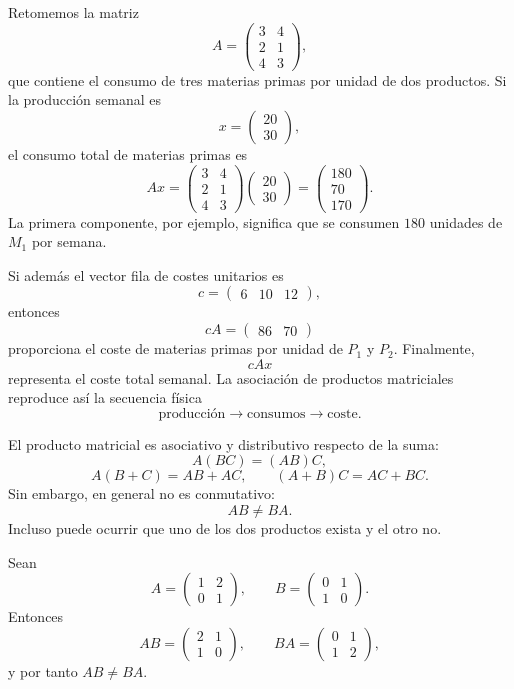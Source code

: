 \begin{example}
Retomemos la matriz
\[
A=
\begin{pmatrix}
3&4\\
2&1\\
4&3
\end{pmatrix},
\]
que contiene el consumo de tres materias primas por unidad de dos productos. Si la producción semanal es
\[
x=\begin{pmatrix}20\\30\end{pmatrix},
\]
el consumo total de materias primas es
\[
Ax=
\begin{pmatrix}
3&4\\
2&1\\
4&3
\end{pmatrix}
\begin{pmatrix}20\\30\end{pmatrix}
=
\begin{pmatrix}
180\\70\\170
\end{pmatrix}.
\]
La primera componente, por ejemplo, significa que se consumen $180$ unidades de $M_1$ por semana.

Si además el vector fila de costes unitarios es
\[
c=\begin{pmatrix}6&10&12\end{pmatrix},
\]
entonces
\[
cA
=
\begin{pmatrix}86&70\end{pmatrix}
\]
proporciona el coste de materias primas por unidad de $P_1$ y $P_2$. Finalmente,
\[
cAx
\]
representa el coste total semanal. La asociación de productos matriciales reproduce así la secuencia física
\[
\text{producción}\longrightarrow\text{consumos}\longrightarrow\text{coste}.
\]
\end{example}

El producto matricial es asociativo y distributivo respecto de la suma:
\[
A(BC)=(AB)C,
\]
\[
A(B+C)=AB+AC,
\qquad
(A+B)C=AC+BC.
\]
Sin embargo, en general no es conmutativo:
\[
AB\neq BA.
\]
Incluso puede ocurrir que uno de los dos productos exista y el otro no.

\begin{example}
Sean
\[
A=\begin{pmatrix}1&2\\0&1\end{pmatrix},
\qquad
B=\begin{pmatrix}0&1\\1&0\end{pmatrix}.
\]
Entonces
\[
AB=\begin{pmatrix}2&1\\1&0\end{pmatrix},
\qquad
BA=\begin{pmatrix}0&1\\1&2\end{pmatrix},
\]
y por tanto $AB\neq BA$.
\end{example}

